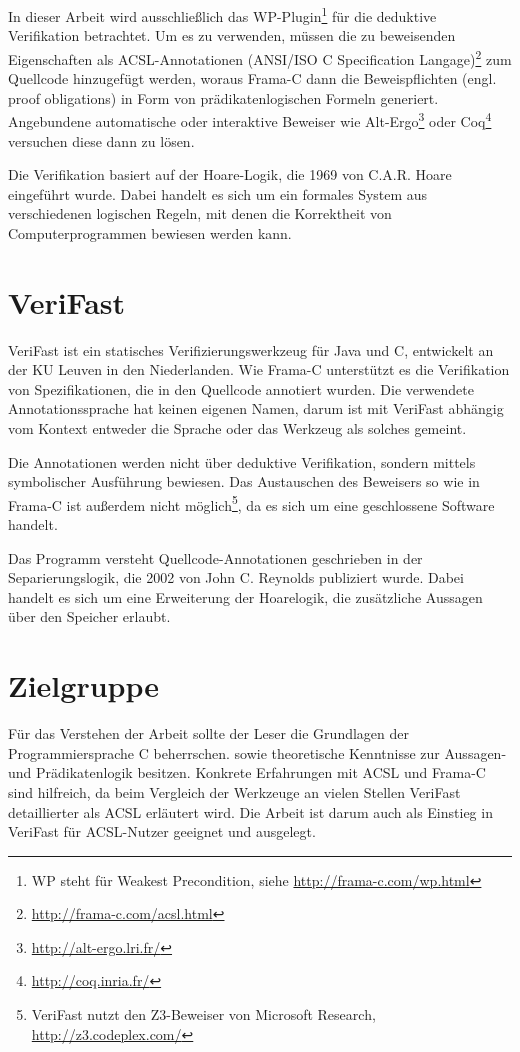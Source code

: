 In dieser Arbeit wird ausschließlich das WP-Plugin\footnote{WP steht für Weakest Precondition, siehe
\url{http://frama-c.com/wp.html}} für die deduktive Verifikation betrachtet. Um es zu verwenden, müssen die zu beweisenden 
Eigenschaften als ACSL-Annotationen (ANSI/ISO C Specification Langage)\footnote{\url{http://frama-c.com/acsl.html}} zum Quellcode hinzugefügt werden, woraus Frama-C dann die 
Beweispflichten (engl. proof obligations) in Form von prädikatenlogischen Formeln generiert. Angebundene automatische oder 
interaktive Beweiser wie Alt-Ergo\footnote{\url{http://alt-ergo.lri.fr/}} oder Coq\footnote{\url{http://coq.inria.fr/}}
versuchen diese dann zu lösen.

Die Verifikation basiert auf der Hoare-Logik, die 1969 von C.A.R. Hoare eingeführt wurde\cite{hoare}. Dabei
handelt es sich um ein formales System aus verschiedenen logischen Regeln, mit denen die Korrektheit von
Computerprogrammen bewiesen werden kann.


\section{VeriFast}
\label{sec:VeriFast}

VeriFast ist ein statisches Verifizierungswerkzeug für Java und C, entwickelt an der KU Leuven in den Niederlanden.
Wie Frama-C unterstützt es die Verifikation von Spezifikationen, die in den Quellcode annotiert wurden. Die verwendete
Annotationssprache hat keinen eigenen Namen, darum ist mit \glqq VeriFast\grqq{} abhängig vom Kontext entweder die Sprache oder das
Werkzeug als solches gemeint.

Die Annotationen werden nicht über deduktive Verifikation, sondern mittels symbolischer Ausführung bewiesen. Das Austauschen
des Beweisers so wie in Frama-C ist außerdem nicht möglich\footnote{VeriFast nutzt den Z3-Beweiser von Microsoft Research,
\url{http://z3.codeplex.com/}}, da es sich um eine geschlossene Software handelt.

Das Programm versteht Quellcode-Annotationen geschrieben in der Separierungslogik, die 2002 von John C. Reynolds publiziert
wurde\cite{reynolds-2002}. Dabei handelt es sich um eine Erweiterung der Hoarelogik, die zusätzliche Aussagen über den Speicher
erlaubt.


\section{Zielgruppe}
\label{sec:zielgruppe}

Für das Verstehen der Arbeit sollte der Leser die Grundlagen der Programmiersprache C beherrschen.
sowie theoretische Kenntnisse zur Aussagen- und Prädikatenlogik besitzen.
Konkrete Erfahrungen mit ACSL und Frama-C sind hilfreich, da beim Vergleich der Werkzeuge an vielen
Stellen VeriFast detaillierter als ACSL erläutert wird. Die Arbeit ist darum auch als Einstieg in VeriFast
für ACSL-Nutzer geeignet und ausgelegt.

 

